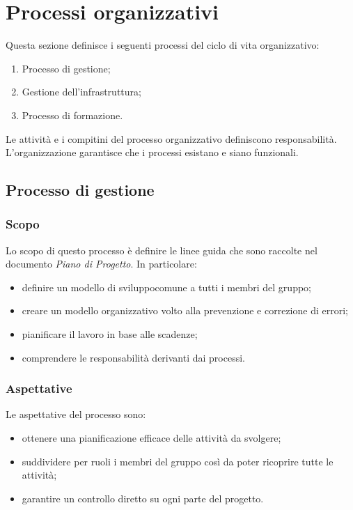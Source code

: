 \section{Processi organizzativi}
	Questa sezione definisce i seguenti processi del ciclo di vita organizzativo:
	\begin{enumerate}
		\item Processo di gestione;
		\item Gestione dell'infrastruttura;
		\item Processo di formazione.
	\end{enumerate}
	Le attività e i compitini del processo organizzativo definiscono responsabilità. L'organizzazione garantisce che i processi esistano e siano funzionali.
	
	
	\subsection{Processo di gestione}
		\subsubsection{Scopo}

		Lo scopo di questo processo è definire le linee guida che sono raccolte nel documento \textit{Piano di Progetto}. In particolare:
		\begin{itemize}
			\item definire un modello di sviluppo\glosp comune a tutti i membri del gruppo; 
			\item creare un modello organizzativo volto alla prevenzione e correzione di errori;
			\item pianificare il lavoro in base alle scadenze;
			\item comprendere le responsabilità derivanti dai processi.
		\end{itemize}

		\subsubsection{Aspettative}
		Le aspettative del processo sono:
		\begin{itemize}
			\item ottenere una pianificazione efficace delle attività da svolgere;
			\item suddividere per ruoli i membri del gruppo così da poter ricoprire tutte le attività;
			\item garantire un controllo diretto su ogni parte del progetto.
		\end{itemize}
		
